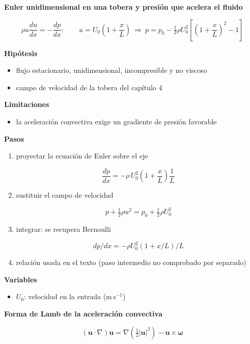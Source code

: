 \documentclass[10pt,openany]{book}
\begin{document}
\begin{tcolorbox}[title={Desarrollos del modelo}, studiumdef, breakable]

\noindent\textbf{Euler unidimensional en una tobera y presión que acelera el fluido}

\begin{equation}
\rho u\frac{du}{dx} = -\frac{dp}{dx}:\qquad u = U_0\left(1 + \frac{x}{L}\right)\ \Rightarrow\ p = p_0 - \tfrac12\rho U_0^{2}\left[\left(1 + \frac{x}{L}\right)^{2} - 1\right]
\label{eq:c14-euler-1d}
\end{equation}

\noindent\textbf{Hipótesis}
\begin{itemize}
\item flujo estacionario, unidimensional, incompresible y no viscoso
\item campo de velocidad de la tobera del capítulo 4
\end{itemize}

\noindent\textbf{Limitaciones}
\begin{itemize}
\item la aceleración convectiva exige un gradiente de presión favorable
\end{itemize}

\noindent\textbf{Pasos}
\begin{enumerate}
\item
proyectar la ecuación de Euler sobre el eje

\[
\frac{dp}{dx} = -\rho\,U_0^{2}\left(1 + \frac{x}{L}\right)\frac{1}{L}
\]
\item
sustituir el campo de velocidad

\[
p + \tfrac12\rho u^{2} = p_0 + \tfrac12\rho U_0^{2}
\]
\item
integrar: se recupera Bernoulli

\[
dp/dx = -\rho U_0^{2}(1 + x/L)/L
\]
\item
relación usada en el texto (paso intermedio no comprobado por separado)
\end{enumerate}

\noindent\textbf{Variables}
\begin{itemize}
\item $U_{0}$: velocidad en la entrada ($\mathrm{m}\,\mathrm{s}^{-1}$)
\end{itemize}



\noindent\textbf{Forma de Lamb de la aceleración convectiva}

\begin{equation}
(\mathbf{u}\cdot\nabla)\mathbf{u} = \nabla\!\left(\tfrac12|\mathbf{u}|^{2}\right) - \mathbf{u}\times\boldsymbol{\omega}
\label{eq:c14-lamb}
\end{equation}


\end{tcolorbox}
\end{document}
